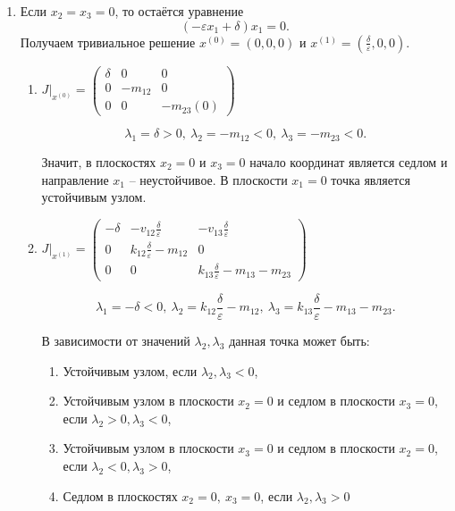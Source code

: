     \begin{enumerate}
        \item Если \( x_2 = x_3 = 0 \), то остаётся уравнение 
        \[ ( -\varepsilon x_1 + \delta ) x_1 = 0. \] 
        Получаем тривиальное решение \( x^{(0)} = (0,0,0) \) и \( x^{(1)} = \left(\frac{\delta}{\varepsilon}, 0, 0 \right) \).
        \begin{enumerate}
            \item \( J \big|_{x^{(0)}} = \left(
                \begin{matrix}
                    \delta & 0 & 0 \\
                    0 & -m_{12}  & 0 \\
                    0 & 0 & -m_{23} (0)
                \end{matrix}
            \right) \)

            \[
                \lambda_1 = \delta> 0, ~
                \lambda_2 = -m_{12} < 0, ~
                \lambda_3 = -m_{23} < 0.
            \]

            Значит, в плоскостях \( x_2 = 0 \) и \( x_3 = 0 \) начало координат является седлом и направление \( x_1 \) -- неустойчивое. В плоскости \( x_1 = 0 \) точка является устойчивым узлом.

            \item \( J \big|_{x^{(1)}} = \left(
                \begin{matrix}
                    -\delta & -v_{12} \frac{\delta}{\varepsilon} & -v_{13} \frac{\delta}{\varepsilon} \\
                    0 & k_{12} \frac{\delta}{\varepsilon} - m_{12} & 0 \\
                    0 & 0 & k_{13} \frac{\delta}{\varepsilon} -m_{13} - m_{23}
                \end{matrix}
            \right) \)

            \[
                \lambda_1 = -\delta < 0, ~
                \lambda_2 = k_{12} \frac{\delta}{\varepsilon} - m_{12}, ~
                \lambda_3 = k_{13} \frac{\delta}{\varepsilon} -m_{13} - m_{23}. 
            \]

            В зависимости от значений \( \lambda_2, \lambda_3 \) данная точка может быть:
            \begin{enumerate}
                \item Устойчивым узлом, если \( \lambda_2, \lambda_3 < 0 \),
                \item Устойчивым узлом в плоскости \( x_2 = 0 \) и седлом в плоскости \( x_3 = 0 \), если \( \lambda_2 > 0, \lambda_3 < 0 \),
                \item Устойчивым узлом в плоскости \( x_3 = 0 \) и седлом в плоскости \( x_2 = 0 \), если \( \lambda_2 < 0, \lambda_3 > 0 \),
                \item Седлом в плоскостях \( x_2 = 0, ~ x_3 = 0 \), если \( \lambda_2, \lambda_3 > 0 \)
            \end{enumerate}
            

\end{enumerate}
\end{enumerate}
